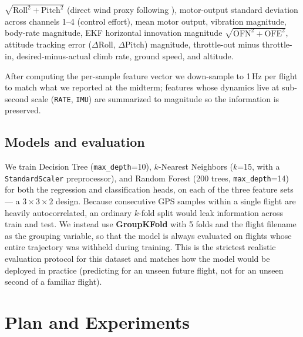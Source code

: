 \documentclass[sigconf, nonacm]{acmart}
\begin{document}
\begin{enumerate}[leftmargin=1.2em]
\begin{itemize}[leftmargin=1.2em]
    $\sqrt{\mathrm{Roll}^2+\mathrm{Pitch}^2}$ (direct wind proxy following
    \cite{palomaki2017}), motor-output standard deviation across channels
    1--4 (control effort), mean motor output, vibration magnitude, body-rate
    magnitude, EKF horizontal innovation magnitude $\sqrt{\mathrm{OFN}^2+\mathrm{OFE}^2}$,
    attitude tracking error ($\Delta\mathrm{Roll}$, $\Delta\mathrm{Pitch}$)
    magnitude, throttle-out minus throttle-in, desired-minus-actual climb
    rate, ground speed, and altitude.
  \end{itemize}
  After computing the per-sample feature vector we down-sample to 1\,Hz
  per flight to match what we reported at the midterm; features whose
  dynamics live at sub-second scale (\texttt{RATE}, \texttt{IMU}) are
  summarized to magnitude so the information is preserved.
\end{enumerate}

\subsection{Models and evaluation}
We train Decision Tree (\texttt{max\_depth}=10), $k$-Nearest Neighbors
($k$=15, with a \texttt{StandardScaler} preprocessor), and Random Forest
(200 trees, \texttt{max\_depth}=14) for both the regression and
classification heads, on each of the three feature sets --- a $3\times3\times2$
design.  Because consecutive GPS samples within a single flight are
heavily autocorrelated, an ordinary $k$-fold split would leak information
across train and test.  We instead use \textbf{GroupKFold} with 5 folds and
the flight filename as the grouping variable, so that the model is always
evaluated on flights whose entire trajectory was withheld during training.
This is the strictest realistic evaluation protocol for this dataset and
matches how the model would be deployed in practice (predicting for an
unseen future flight, not for an unseen second of a familiar flight).

\section{Plan and Experiments}
\end{document}
